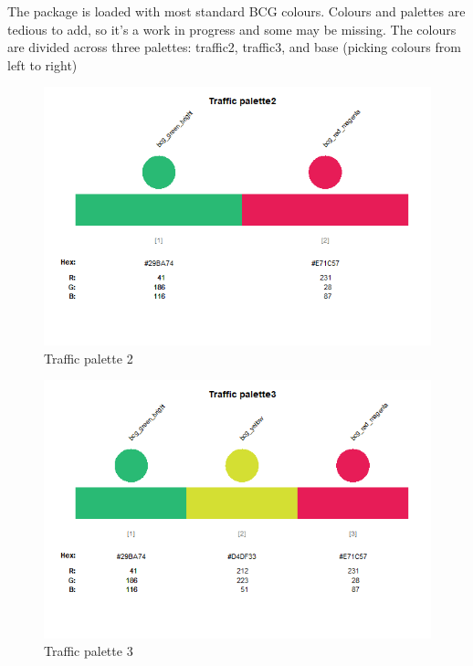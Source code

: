 \documentclass[
]{article}
\begin{document}
The package is loaded with most standard BCG colours. Colours and
palettes are tedious to add, so it's a work in progress and some may be
missing. The colours are divided across three palettes: traffic2,
traffic3, and base (picking colours from left to right)

\begin{figure}
\centering
\includegraphics{traffic2.png}
\caption{Traffic palette 2}
\end{figure}

\begin{figure}
\centering
\includegraphics{traffic3.png}
\caption{Traffic palette 3}
\end{figure}
\end{document}
